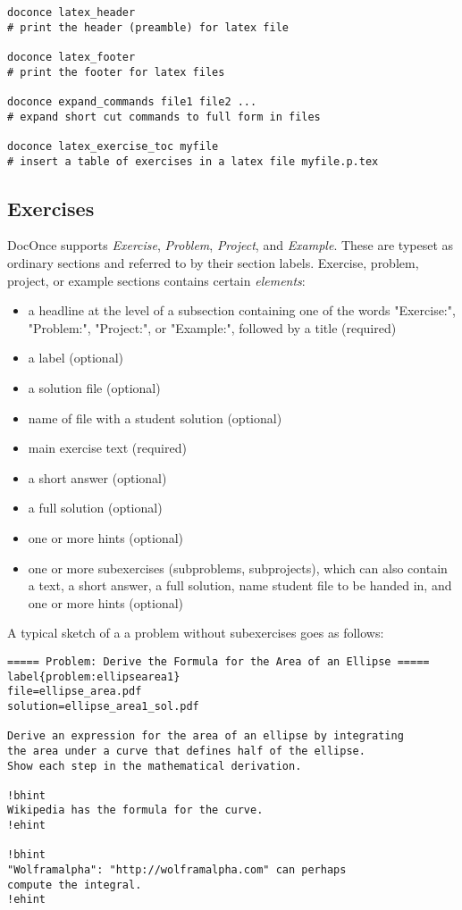 \documentclass[%
oneside,                 %
final,                   %
10pt]{article}
\newcounter{doconce:movie:counter}
\begin{document}
\begin{Verbatim}[numbers=none,fontsize=\fontsize{9pt}{9pt},baselinestretch=0.95,xleftmargin=2mm]
doconce latex_header                                                   
# print the header (preamble) for latex file

doconce latex_footer                                                   
# print the footer for latex files

doconce expand_commands file1 file2 ...                                
# expand short cut commands to full form in files

doconce latex_exercise_toc myfile                                      
# insert a table of exercises in a latex file myfile.p.tex

\end{Verbatim}

\subsection{Exercises}
DocOnce supports \emph{Exercise}, \emph{Problem}, \emph{Project}, and \emph{Example}.
These are typeset
as ordinary sections and referred to by their section labels.
Exercise, problem, project, or example sections contains certain \emph{elements}:
\begin{itemize}
  \item a headline at the level of a subsection
    containing one of the words "Exercise:", "Problem:",
    "Project:", or "Example:", followed by a title (required)
  \item a label (optional)
  \item a solution file (optional)
  \item name of file with a student solution (optional)
  \item main exercise text (required)
  \item a short answer (optional)
  \item a full solution (optional)
  \item one or more hints (optional)
  \item one or more subexercises (subproblems, subprojects), which can also
    contain a text, a short answer, a full solution, name student file
    to be handed in, and one or more hints (optional)
\end{itemize}
\noindent
A typical sketch of a a problem without subexercises goes as follows:
\begin{Verbatim}[numbers=none,fontsize=\fontsize{9pt}{9pt},baselinestretch=0.95,xleftmargin=2mm]
===== Problem: Derive the Formula for the Area of an Ellipse =====
label{problem:ellipsearea1}
file=ellipse_area.pdf
solution=ellipse_area1_sol.pdf

Derive an expression for the area of an ellipse by integrating
the area under a curve that defines half of the ellipse.
Show each step in the mathematical derivation.

!bhint
Wikipedia has the formula for the curve.
!ehint

!bhint
"Wolframalpha": "http://wolframalpha.com" can perhaps
compute the integral.
!ehint

\end{Verbatim}
\end{document}
